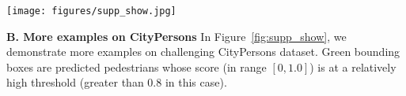 \documentclass[10pt,twocolumn,letterpaper]{article}
\begin{document}
\begin{figure*}
\centering
\texttt{[image: figures/supp\_show.jpg]}
\caption{More examples on CityPersons dataset. Green bounding boxes are predicted pedestrians whose score ([0, 1.0]) is greater than 0.8.}
\label{fig:supp_show}
\end{figure*}

\textbf{B. More examples on CityPersons}
In Figure~\ref{fig:supp_show}, we demonstrate more examples on challenging CityPersons dataset. Green bounding boxes are predicted pedestrians whose score (in range $\left[0, 1.0\right]$) is at a relatively high threshold (greater than 0.8 in this case).
\end{document}
